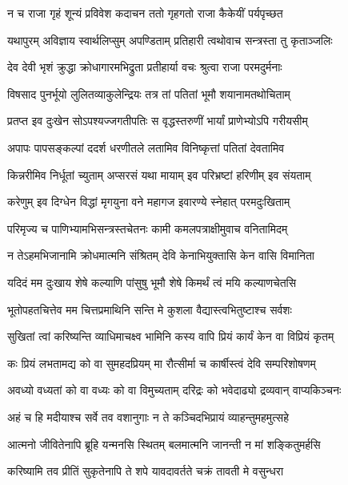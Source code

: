 \twolineshloka
{न च राजा गृहं शून्यं प्रविवेश कदाचन}
{ततो गृहगतो राजा कैकेयीं पर्यपृच्छत} %

\twolineshloka
{यथापुरम् अविज्ञाय स्वार्थलिप्सुम् अपण्डिताम्}
{प्रतिहारी त्वथोवाच सन्त्रस्ता तु कृताञ्जलिः} %

\twolineshloka
{देव देवी भृशं क्रुद्धा क्रोधागारमभिद्रुता}
{प्रतीहार्या वचः श्रुत्वा राजा परमदुर्मनाः} %

\twolineshloka
{विषसाद पुनर्भूयो लुलितव्याकुलेन्द्रियः}
{तत्र तां पतितां भूमौ शयानामतथोचिताम्} %

\twolineshloka
{प्रतप्त इव दुःखेन सोऽपश्यज्जगतीपतिः}
{स वृद्धस्तरुणीं भार्यां प्राणेभ्योऽपि गरीयसीम्} %

\twolineshloka
{अपापः पापसङ्कल्पां ददर्श धरणीतले}
{लतामिव विनिष्कृत्तां पतितां देवतामिव} %

\twolineshloka
{किन्नरीमिव निर्धूतां च्युताम् अप्सरसं यथा}
{मायाम् इव परिभ्रष्टां हरिणीम् इव संयताम्} %

\twolineshloka
{करेणुम् इव दिग्धेन विद्धां मृगयुना वने}
{महागज इवारण्ये स्नेहात् परमदुःखिताम्} %

\twolineshloka
{परिमृज्य च पाणिभ्यामभिसन्त्रस्तचेतनः}
{कामी कमलपत्राक्षीमुवाच वनितामिदम्} %

\twolineshloka
{न तेऽहमभिजानामि क्रोधमात्मनि संश्रितम्}
{देवि केनाभियुक्तासि केन वासि विमानिता} %

\twolineshloka
{यदिदं मम दुःखाय शेषे कल्याणि पांसुषु}
{भूमौ शेषे किमर्थं त्वं मयि कल्याणचेतसि} %

\twolineshloka
{भूतोपहतचित्तेव मम चित्तप्रमाथिनि}
{सन्ति मे कुशला वैद्यास्त्वभितुष्टाश्च सर्वशः} %

\twolineshloka
{सुखितां त्वां करिष्यन्ति व्याधिमाचक्ष्व भामिनि}
{कस्य वापि प्रियं कार्यं केन वा विप्रियं कृतम्} %

\twolineshloka
{कः प्रियं लभतामद्य को वा सुमहदप्रियम्}
{मा रौत्सीर्मा च कार्षीस्त्वं देवि सम्परिशोषणम्} %

\twolineshloka
{अवध्यो वध्यतां को वा वध्यः को वा विमुच्यताम्}
{दरिद्रः को भवेदाढ्यो द्रव्यवान् वाप्यकिञ्चनः} %

\twolineshloka
{अहं च हि मदीयाश्च सर्वे तव वशानुगाः}
{न ते कञ्चिदभिप्रायं व्याहन्तुमहमुत्सहे} %

\twolineshloka
{आत्मनो जीवितेनापि ब्रूहि यन्मनसि स्थितम्}
{बलमात्मनि जानन्ती न मां शङ्कितुमर्हसि} %

\twolineshloka
{करिष्यामि तव प्रीतिं सुकृतेनापि ते शपे}
{यावदावर्तते चक्रं तावती मे वसुन्धरा} %

